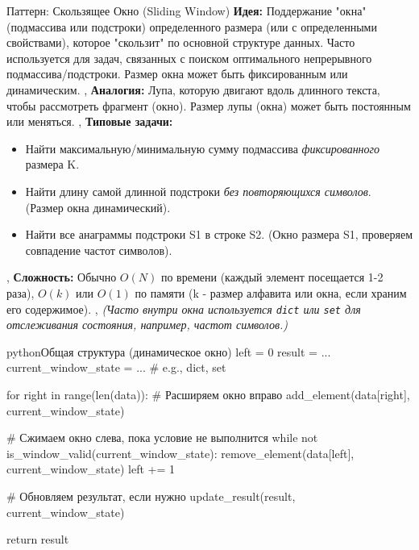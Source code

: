 \begin{textbox}{Паттерн: Скользящее Окно (Sliding Window)}
    \textbf{Идея:} Поддержание "окна" (подмассива или подстроки) определенного размера (или с определенными свойствами), которое "скользит" по основной структуре данных. Часто используется для задач, связанных с поиском оптимального непрерывного подмассива/подстроки. Размер окна может быть фиксированным или динамическим. \sep
    \textbf{Аналогия:} Лупа, которую двигают вдоль длинного текста, чтобы рассмотреть фрагмент (окно). Размер лупы (окна) может быть постоянным или меняться. \sep
    \textbf{Типовые задачи:}
    \begin{itemize}[nosep, leftmargin=*]
        \item Найти максимальную/минимальную сумму подмассива \textit{фиксированного} размера K.
        \item Найти длину самой длинной подстроки \textit{без повторяющихся символов}. (Размер окна динамический).
        \item Найти все анаграммы подстроки S1 в строке S2. (Окно размера S1, проверяем совпадение частот символов).
    \end{itemize} \sep
    \textbf{Сложность:} Обычно \textbf{$O(N)$} по времени (каждый элемент посещается 1-2 раза), \textbf{$O(k)$} или \textbf{$O(1)$} по памяти (k - размер алфавита или окна, если храним его содержимое). \sep %
    \textit{(Часто внутри окна используется \texttt{dict} или \texttt{set} для отслеживания состояния, например, частот символов.)}
    \begin{codebox}{python}{Общая структура (динамическое окно)}
    left = 0
    result = ...
    current_window_state = ... # e.g., dict, set

    for right in range(len(data)):
        # Расширяем окно вправо
        add_element(data[right], current_window_state)

        # Сжимаем окно слева, пока условие не выполнится
        while not is_window_valid(current_window_state):
            remove_element(data[left], current_window_state)
            left += 1

        # Обновляем результат, если нужно
        update_result(result, current_window_state)

    return result
    \end{codebox}
\end{textbox}

